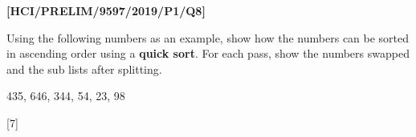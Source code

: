 \item \textbf{{[}HCI/PRELIM/9597/2019/P1/Q8{]} }

Using the following numbers as an example, show how the numbers can
be sorted in ascending order using a \textbf{quick sort}. For each
pass, show the numbers swapped and the sub lists after splitting. 
\noindent \begin{center}
435, 646, 344, 54, 23, 98
\par\end{center}

\noindent \begin{flushleft}
\hfill{}{[}7{]}
\par\end{flushleft}